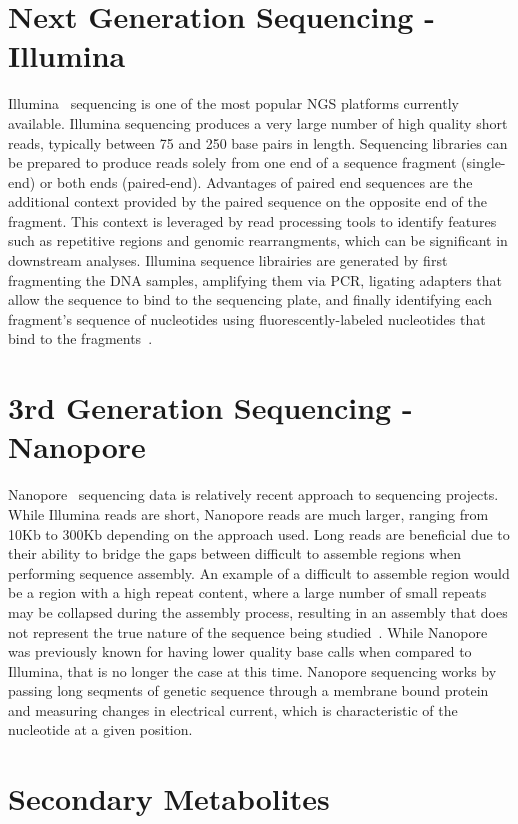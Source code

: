 \section{Next Generation Sequencing - Illumina}
Illumina\texttrademark ~\cite{Bennett2004} sequencing is one of the
most popular NGS platforms currently available. Illumina sequencing
produces a very large number of high quality short reads, typically
between 75 and 250 base pairs in length. Sequencing libraries can be
prepared to produce reads solely from one end of a sequence fragment
(single-end) or both ends (paired-end). Advantages of paired end
sequences are the additional context provided by the paired sequence
on the opposite end of the fragment. This context is leveraged by read
processing tools to identify features such as repetitive regions and
genomic rearrangments, which can be significant in downstream
analyses. Illumina sequence librairies are generated by first
fragmenting the DNA samples, amplifying them via PCR, ligating
adapters that allow the sequence to bind to the sequencing plate, and
finally identifying each fragment's sequence of nucleotides using
fluorescently-labeled nucleotides that bind to the
fragments~\cite{Goodwin2016}.

\section{3rd Generation Sequencing - Nanopore}

Nanopore\texttrademark ~\cite{Wang2021} sequencing data is relatively
recent approach to sequencing projects. While Illumina reads are
short, Nanopore reads are much larger, ranging from 10Kb to 300Kb
depending on the approach used. Long reads are beneficial due to their
ability to bridge the gaps between difficult to assemble regions when
performing sequence assembly. An example of a difficult to assemble
region would be a region with a high repeat content, where a large
number of small repeats may be collapsed during the assembly process,
resulting in an assembly that does not represent the true nature of
the sequence being studied~\cite{Marx2023}. While Nanopore was
previously known for having lower quality base calls when compared to
Illumina, that is no longer the case at this time. Nanopore sequencing
works by passing long seqments of genetic sequence through a membrane
bound protein and measuring changes in electrical current, which is
characteristic of the nucleotide at a given position.

\section{Secondary Metabolites}

